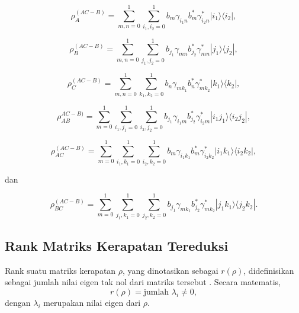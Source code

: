 \begin{equation}
\rho_{A}^{(AC-B)} = \sum_{m,n=0}^{1}\sum_{i_1,i_2=0}^{1}b_m \gamma_{i_1 n}b^{*}_m\gamma^{*}_{i_2 n}|i_1\rangle \langle i_2|,
\end{equation}

\begin{equation}
\rho_{B}^{(AC-B)} = \sum_{m,n=0}^{1}\sum_{j_1,j_2=0}^{1} b_{j_1}\gamma_{mn}b^{*}_{j_2}\gamma^{*}_{mn}|j_1\rangle \langle j_2|,
\end{equation}

\begin{equation}
\rho_{C}^{(AC-B)} = \sum_{m,n=0}^{1}\sum_{k_1,k_2=0}^{1}b_n \gamma_{m k_1}b^{*}_n\gamma^{*}_{m k_2}|k_1\rangle \langle k_2|,
\end{equation}

\begin{equation}
\rho_{AB}^{AC-B)} = \sum_{m=0}^{1} \sum_{i_1,j_1=0}^{1}\sum_{i_2,j_2=0}^{1} b_{j_1}\gamma_{i_1 m}b^{*}_{j_2}\gamma^{*}_{i_2 m}|i_1 j_1\rangle \langle i_2 j_2|,
\end{equation}

\begin{equation}
\rho_{AC}^{(AC-B)} = \sum_{m=0}^{1} \sum_{i_1,k_1=0}^{1}\sum_{i_2,k_2=0}^{1} b_m \gamma_{i_1 k_1}b^{*}_m\gamma^{*}_{i_2 k_2}|i_1 k_1\rangle \langle i_2 k_2|,
\end{equation}

dan

\begin{equation}
\rho_{BC}^{(AC-B)} = \sum_{m=0}^{1} \sum_{j_1,k_1=0}^{1}\sum_{j_2,k_2=0}^{1} b_{j_1}\gamma_{m k_1}b^{*}_{j_2}\gamma^{*}_{m k_2}|j_1 k_1\rangle \langle j_2 k_2|.
\end{equation}


\subsection{Rank Matriks Kerapatan Tereduksi}
\par
Rank suatu matriks kerapatan $\rho$, yang dinotasikan sebagai $r(\rho)$, didefinisikan sebagai jumlah nilai eigen tak nol dari matriks tersebut \cite{nielsen2010quantum, wilde_2017, bengtsson2017geometry, Watrous2018}. Secara matematis,
\begin{equation}
r(\rho) = \text{jumlah } \lambda_i \neq 0,
\end{equation}
dengan $\lambda_i$ merupakan nilai eigen dari $\rho$.

